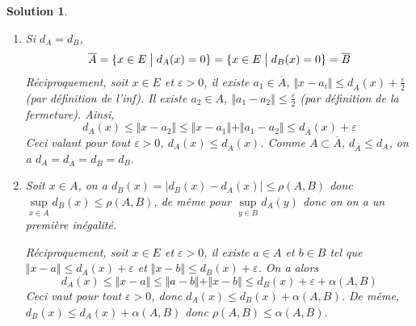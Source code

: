 \documentclass[12pt]{article}
\newtheorem{solution}{Solution}[section]
\theoremstyle{remark}
\numberwithin{equation}{section}
\begin{document}
\begin{solution}
	\phantom{}
	\begin{enumerate}
		\item Si $d_{A}=d_{B}$, 
		$$\overline{A}=\{x\in E\bigm| d_{A}(x)=0\}=\{x\in E\bigm| d_{B}(x)=0\}=\overline{B}$$
		Réciproquement, soit $x\in E$ et $\varepsilon>0$, il existe $a_{1}\in\overline{A}$, $\Vert x-a_{i}\Vert\leqslant d_{\overline{A}}(x)+\frac{\varepsilon}{2}$ (par définition de l'inf). Il existe $a_{2}\in A$, $\Vert a_{1}-a_{2}\Vert\leqslant\frac{\varepsilon}{2}$ (par définition de la fermeture). Ainsi,
		$$d_{A}(x)\leqslant\Vert x-a_{2}\Vert\leqslant\Vert x-a_{1}\Vert+\Vert a_{1}-a_{2}\Vert\leqslant d_{\overline{A}}(x)+\varepsilon$$
		Ceci valant pour tout $\varepsilon>0$, $d_{A}(x)\leqslant d_{\overline{A}}(x)$. Comme $A\subset\overline{A}$, $d_{\overline{A}}\leqslant d_{A}$, on a $d_{A}=d_{\overline{A}}=d_{\overline{B}}=d_{B}$.

		\item Soit $x\in A$, on a $d_{B}(x)=\vert d_{B}(x)-d_{A}(x)\vert\leqslant\rho(A,B)$ donc $\sup\limits_{x\in A}d_{B}(x)\leqslant\rho(A,B)$, de même pour $\sup\limits_{y\in B}d_{A}(y)$ donc on on a un première inégalité.
		
		Réciproquement, soit $x\in E$ et $\varepsilon>0$, il existe $a\in A$ et $b\in B$ tel que $\Vert x-a\Vert\leqslant d_{A}(x)+\varepsilon$ et $\Vert x-b\Vert\leqslant d_{B}(x)+\varepsilon$.
		On a alors
		$$d_{A}(x)\leqslant\Vert x-a\Vert\leqslant\Vert a-b\Vert+\Vert x-b\Vert\leqslant d_{B}(x)+\varepsilon+\alpha(A,B)$$
		Ceci vaut pour tout $\varepsilon>0$, donc $d_{A}(x)\leqslant d_{B}(x)+\alpha(A,B)$. De même, $d_{B}(x)\leqslant d_{A}(x)+\alpha(A,B)$ donc $\rho(A,B)\leqslant\alpha(A,B)$.
	\end{enumerate}
\end{solution}
\end{document}
